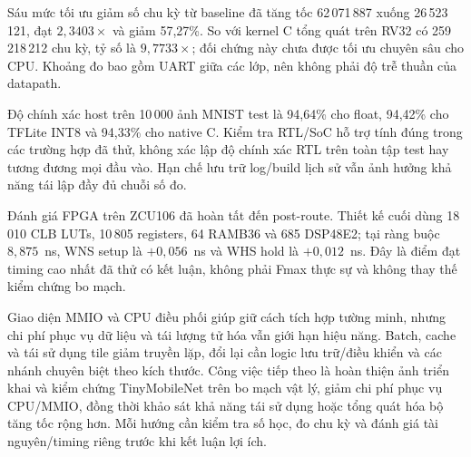 Sáu mức tối ưu giảm số chu kỳ từ baseline đã tăng tốc 62\,071\,887 xuống 26\,523\,121, đạt $2{,}3403\times$ và giảm 57,27\%. So với kernel C tổng quát trên RV32 có 259\,218\,212 chu kỳ, tỷ số là $9{,}7733\times$; đối chứng này chưa được tối ưu chuyên sâu cho CPU. Khoảng đo bao gồm UART giữa các lớp, nên không phải độ trễ thuần của datapath.

Độ chính xác host trên 10\,000 ảnh MNIST test là 94,64\% cho float, 94,42\% cho TFLite INT8 và 94,33\% cho native C. Kiểm tra RTL/SoC hỗ trợ tính đúng trong các trường hợp đã thử, không xác lập độ chính xác RTL trên toàn tập test hay tương đương mọi đầu vào. Hạn chế lưu trữ log/build lịch sử vẫn ảnh hưởng khả năng tái lập đầy đủ chuỗi số đo.

Đánh giá FPGA trên ZCU106 đã hoàn tất đến post-route. Thiết kế cuối dùng 18\,010 CLB LUTs, 10\,805 registers, 64 RAMB36 và 685 DSP48E2; tại ràng buộc $8{,}875$~ns, WNS setup là $+0{,}056$~ns và WHS hold là $+0{,}012$~ns. Đây là điểm đạt timing cao nhất đã thử có kết luận, không phải Fmax thực sự và không thay thế kiểm chứng bo mạch.

Giao diện MMIO và CPU điều phối giúp giữ cách tích hợp tường minh, nhưng chi phí phục vụ dữ liệu và tái lượng tử hóa vẫn giới hạn hiệu năng. Batch, cache và tái sử dụng tile giảm truyền lặp, đổi lại cần logic lưu trữ/điều khiển và các nhánh chuyên biệt theo kích thước. Công việc tiếp theo là hoàn thiện ảnh triển khai và kiểm chứng TinyMobileNet trên bo mạch vật lý, giảm chi phí phục vụ CPU/MMIO, đồng thời khảo sát khả năng tái sử dụng hoặc tổng quát hóa bộ tăng tốc rộng hơn. Mỗi hướng cần kiểm tra số học, đo chu kỳ và đánh giá tài nguyên/timing riêng trước khi kết luận lợi ích.

